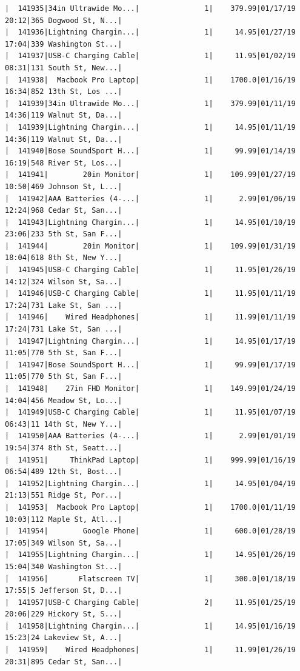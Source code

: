 \documentclass[
  letterpaper,
  DIV=11,
  numbers=noendperiod]{scrartcl}
\begin{document}
\begin{verbatim}
|  141935|34in Ultrawide Mo...|               1|    379.99|01/17/19 20:12|365 Dogwood St, N...|
|  141936|Lightning Chargin...|               1|     14.95|01/27/19 17:04|339 Washington St...|
|  141937|USB-C Charging Cable|               1|     11.95|01/02/19 08:31|131 South St, New...|
|  141938|  Macbook Pro Laptop|               1|    1700.0|01/16/19 16:34|852 13th St, Los ...|
|  141939|34in Ultrawide Mo...|               1|    379.99|01/11/19 14:36|119 Walnut St, Da...|
|  141939|Lightning Chargin...|               1|     14.95|01/11/19 14:36|119 Walnut St, Da...|
|  141940|Bose SoundSport H...|               1|     99.99|01/14/19 16:19|548 River St, Los...|
|  141941|        20in Monitor|               1|    109.99|01/27/19 10:50|469 Johnson St, L...|
|  141942|AAA Batteries (4-...|               1|      2.99|01/06/19 12:24|968 Cedar St, San...|
|  141943|Lightning Chargin...|               1|     14.95|01/10/19 23:06|233 5th St, San F...|
|  141944|        20in Monitor|               1|    109.99|01/31/19 18:04|618 8th St, New Y...|
|  141945|USB-C Charging Cable|               1|     11.95|01/26/19 14:12|324 Wilson St, Sa...|
|  141946|USB-C Charging Cable|               1|     11.95|01/11/19 17:24|731 Lake St, San ...|
|  141946|    Wired Headphones|               1|     11.99|01/11/19 17:24|731 Lake St, San ...|
|  141947|Lightning Chargin...|               1|     14.95|01/17/19 11:05|770 5th St, San F...|
|  141947|Bose SoundSport H...|               1|     99.99|01/17/19 11:05|770 5th St, San F...|
|  141948|    27in FHD Monitor|               1|    149.99|01/24/19 14:04|456 Meadow St, Lo...|
|  141949|USB-C Charging Cable|               1|     11.95|01/07/19 06:43|11 14th St, New Y...|
|  141950|AAA Batteries (4-...|               1|      2.99|01/01/19 19:54|374 8th St, Seatt...|
|  141951|     ThinkPad Laptop|               1|    999.99|01/16/19 06:54|489 12th St, Bost...|
|  141952|Lightning Chargin...|               1|     14.95|01/04/19 21:13|551 Ridge St, Por...|
|  141953|  Macbook Pro Laptop|               1|    1700.0|01/11/19 10:03|112 Maple St, Atl...|
|  141954|        Google Phone|               1|     600.0|01/28/19 17:05|349 Wilson St, Sa...|
|  141955|Lightning Chargin...|               1|     14.95|01/26/19 15:04|340 Washington St...|
|  141956|       Flatscreen TV|               1|     300.0|01/18/19 17:55|5 Jefferson St, D...|
|  141957|USB-C Charging Cable|               2|     11.95|01/25/19 20:06|229 Hickory St, S...|
|  141958|Lightning Chargin...|               1|     14.95|01/16/19 15:23|24 Lakeview St, A...|
|  141959|    Wired Headphones|               1|     11.99|01/26/19 20:31|895 Cedar St, San...|

\end{verbatim}
\end{document}
